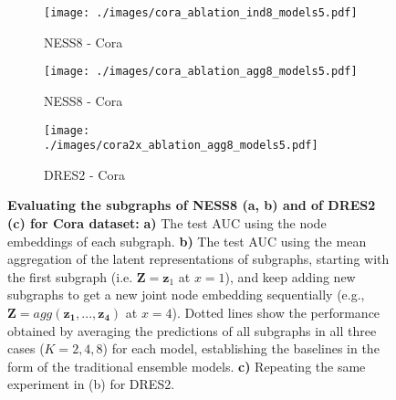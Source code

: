 \documentclass{article}
\begin{document}
\begin{figure}[t]
\vskip 0.2in
\begin{center}
     \begin{subfigure}[c]{0.33\columnwidth}
        \texttt{[image: ./images/cora\_ablation\_ind8\_models5.pdf]}
         \caption{NESS8 - Cora}
     \end{subfigure}
     \begin{subfigure}[c]{0.31\columnwidth}
        \texttt{[image: ./images/cora\_ablation\_agg8\_models5.pdf]}
         \caption{NESS8 - Cora}
     \end{subfigure}
     \begin{subfigure}[c]{0.32\columnwidth}
        \texttt{[image: ./images/cora2x\_ablation\_agg8\_models5.pdf]}
         \caption{DRES2 - Cora}
     \end{subfigure}
\caption{\textbf{Evaluating the subgraphs of NESS8 (a, b) and of DRES2 (c) for Cora dataset:} \textbf{a)} The test AUC using the node embeddings of each subgraph. \textbf{b)} The test AUC using the mean aggregation of the latent representations of subgraphs, starting with the first subgraph (i.e. $\bm Z=\bm z_1$ at $x=1$), and keep adding new subgraphs to get a new joint node embedding sequentially (e.g., $\pmb{Z}=agg(\pmb{z_1}, ..., \pmb{z_4})$ at $x=4$). Dotted lines show the performance obtained by averaging the predictions of all subgraphs in all three cases ($K=2, 4, 8$) for each model, establishing the baselines in the form of the traditional ensemble models. \textbf{c)} Repeating the same experiment in (b) for DRES2.}\label{fig:gradual_aggregation_performance}
\end{center}
\vskip -0.2in
\end{figure}
\end{document}
